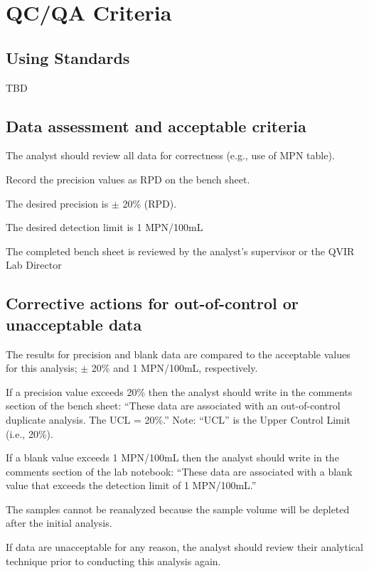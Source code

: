 \documentclass[12pt]{../SOP4_alpha}\usepackage[]{graphicx}\usepackage[]{xcolor}
\begin{document}
\section{QC/QA Criteria}

\subsection{Using Standards}

\NP TBD

\subsection{Data assessment and acceptable criteria}

\NP The analyst should review all data for correctness (e.g., use of MPN table).


\NP Record the precision values as RPD on the bench sheet.

\NP The desired precision is $\pm$ 20\% (RPD).

\NP The desired detection limit is 1 MPN/100mL

\NP The completed bench sheet is reviewed by the analyst's supervisor or the
QVIR Lab Director 


\subsection{Corrective actions for out-of-control or unacceptable data}

\NP The results for precision and blank data are compared to the
acceptable values for this analysis; $\pm$ 20\% and 1 MPN/100mL,
respectively.

\NP If a precision value exceeds 20\% then the analyst should write in the
comments section of the bench sheet: “These data are associated
with an out-of-control duplicate analysis. The UCL = 20\%.” Note:
``UCL'' is the Upper Control Limit (i.e., 20\%).

\NP If a blank value exceeds 1 MPN/100mL then the analyst should write
in the comments section of the lab notebook: ``These data are
associated with a blank value that exceeds the detection limit of 1
MPN/100mL.''

\NP The samples cannot be reanalyzed because the sample volume will be
depleted after the initial analysis.

\NP  If data are unacceptable for any reason, the analyst should review
their analytical technique prior to conducting this analysis again. 
\end{document}
